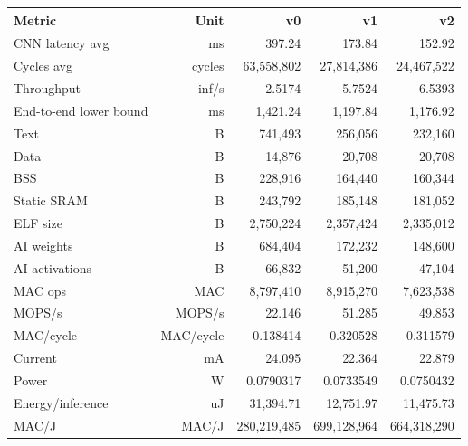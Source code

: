 \begin{tabular}{lrrrr}
\toprule
Metric & Unit & v0 & v1 & v2 \\
\midrule
CNN latency avg & ms & 397.24 & 173.84 & 152.92 \\
Cycles avg & cycles & 63,558,802 & 27,814,386 & 24,467,522 \\
Throughput & inf/s & 2.5174 & 5.7524 & 6.5393 \\
End-to-end lower bound & ms & 1,421.24 & 1,197.84 & 1,176.92 \\
Text & B & 741,493 & 256,056 & 232,160 \\
Data & B & 14,876 & 20,708 & 20,708 \\
BSS & B & 228,916 & 164,440 & 160,344 \\
Static SRAM & B & 243,792 & 185,148 & 181,052 \\
ELF size & B & 2,750,224 & 2,357,424 & 2,335,012 \\
AI weights & B & 684,404 & 172,232 & 148,600 \\
AI activations & B & 66,832 & 51,200 & 47,104 \\
MAC ops & MAC & 8,797,410 & 8,915,270 & 7,623,538 \\
MOPS/s & MOPS/s & 22.146 & 51.285 & 49.853 \\
MAC/cycle & MAC/cycle & 0.138414 & 0.320528 & 0.311579 \\
Current & mA & 24.095 & 22.364 & 22.879 \\
Power & W & 0.0790317 & 0.0733549 & 0.0750432 \\
Energy/inference & uJ & 31,394.71 & 12,751.97 & 11,475.73 \\
MAC/J & MAC/J & 280,219,485 & 699,128,964 & 664,318,290 \\
\bottomrule
\end{tabular}
